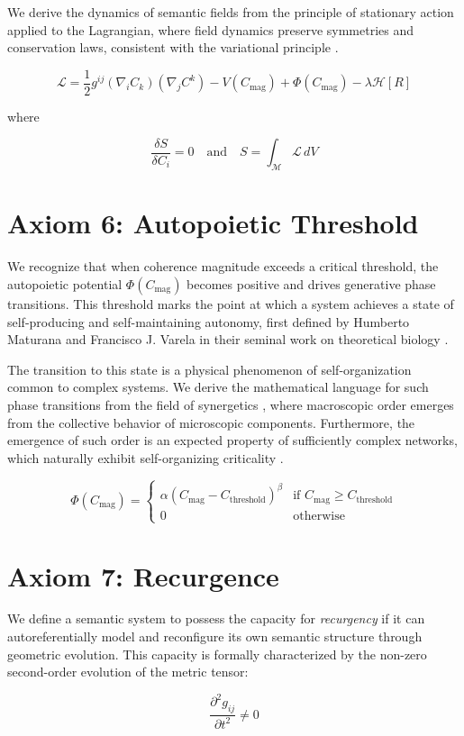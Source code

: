 We derive the dynamics of semantic fields from the principle of stationary action applied to the Lagrangian, where field dynamics preserve symmetries and conservation laws, consistent with the variational principle \autocite{GoldsteinPooleSafko2002, Arnold1989}.

\begin{equation}\label{eq:lagrangian_axiom}
\mathcal{L} = \frac{1}{2} g^{ij} (\nabla_i C_k)(\nabla_j C^k) - V(C_{\text{mag}}) + \Phi(C_{\text{mag}}) - \lambda \mathcal{H}[R]
\end{equation}

where

\begin{equation}
\frac{\delta S}{\delta C_i} = 0 \quad \text{and} \quad S = \int_{\mathcal{M}} \mathcal{L} \, dV
\end{equation}

\section{Axiom 6: Autopoietic Threshold}\label{axiom_6}

We recognize that when coherence magnitude exceeds a critical threshold, the autopoietic potential \(\Phi(C_{\text{mag}})\) becomes positive and drives generative phase transitions. This threshold marks the point at which a system achieves a state of self-producing and self-maintaining autonomy, first defined by Humberto Maturana and Francisco J. Varela in their seminal work on theoretical biology \autocite{MaturanaVarela1980}.

The transition to this state is a physical phenomenon of self-organization common to complex systems. We derive the mathematical language for such phase transitions from the field of synergetics \autocite{Haken1983}, where macroscopic order emerges from the collective behavior of microscopic components. Furthermore, the emergence of such order is an expected property of sufficiently complex networks, which naturally exhibit self-organizing criticality \autocite{BakTangWiesenfeld1987}.

\begin{equation}
\Phi(C_{\text{mag}}) = \begin{cases}
\alpha (C_{\text{mag}} - C_{\text{threshold}})^{\beta} & \text{if } C_{\text{mag}} \geq C_{\text{threshold}} \\
0 & \text{otherwise}
\end{cases}
\end{equation}

\section{Axiom 7: Recurgence}\label{axiom_7}

We define a semantic system to possess the capacity for \textit{recurgency} if it can autoreferentially model and reconfigure its own semantic structure through geometric evolution. This capacity is formally characterized by the non-zero second-order evolution of the metric tensor:

\begin{equation}
\frac{\partial^2 g_{ij}}{\partial t^2} \neq 0
\end{equation} 